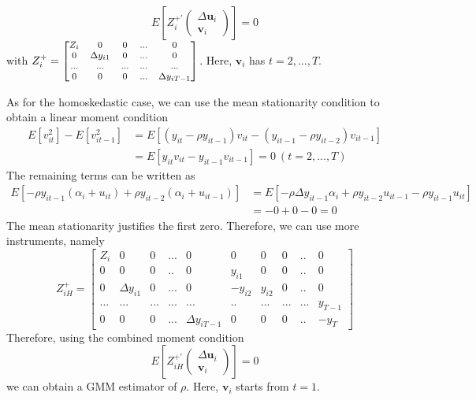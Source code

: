 \documentclass[12pt]{article}
\theoremstyle{definition}
\theoremstyle{property}
\theoremstyle{assumption}
\theoremstyle{example}
\theoremstyle{comment}
\begin{document}
\[
E\left[Z_i^{+'}\begin{pmatrix}\Delta \mathbf{u}_i \\ \mathbf{v}_i\end{pmatrix}\right]=0
\]
with $Z_i^+ = \footnotesize{\begin{bmatrix}Z_i & 0 & 0 & ... &0\\ 0 & \Delta y_{i1} & 0 & ... & 0 \\ ...&...&...&...&...\\ 0& 0& 0& ...& \Delta y_{iT-1}\end{bmatrix}}\normalsize$. Here, $\mathbf{v}_i$ has $t=2,...,T$. \par
As for the homoskedastic case, we can use the mean stationarity condition to obtain a linear moment condition
\begin{align*}
E[v_{it}^2]-E[v_{it-1}^2]&=E[(y_{it}-\rho y_{it-1})v_{it}-(y_{it-1}-\rho y_{it-2})v_{it-1}]\\
&=E[y_{it}v_{it}-y_{it-1}v_{it-1}]=0 \ (t=2,...,T)
\end{align*}
The remaining terms can be written as
\begin{align*}
E[-\rho y_{it-1} (\alpha_i + u_{it})+\rho y_{it-2}(\alpha_i+u_{it-1})]&=E[-\rho \Delta y_{it-1}\alpha_i +\rho y_{it-2}u_{it-1}-\rho y_{it-1}u_{it}]\\&=-0+0-0=0
\end{align*}
The mean stationarity justifies the first zero. Therefore, we can use more instruments, namely
\[
Z_{iH}^+ = \begin{bmatrix}Z_i & 0 & 0 & ... &0& 0&0&0&..&0\\ 0&0&0&..&0& y_{i1}& 0& 0& .. & 0 \\ 0 & \Delta y_{i1} & 0 & ... & 0& -y_{i2}& y_{i2}& 0& .. & 0 \\ ...&...&...&...&...&..&...&...&...&y_{T-1}\\ 0& 0& 0& ...& \Delta y_{iT-1}& 0 & 0 & 0 & .. & -y_T\end{bmatrix}
\]
Therefore, using the combined moment condition
\[
E\left[Z_{iH}^{+'} \begin{pmatrix} \Delta \mathbf{u}_i \\ \mathbf{v}_i\end{pmatrix}\right]=0
\]
we can obtain a GMM estimator of $\rho$. Here, $\mathbf{v}_i$ starts from $t=1$. 
\end{document}

